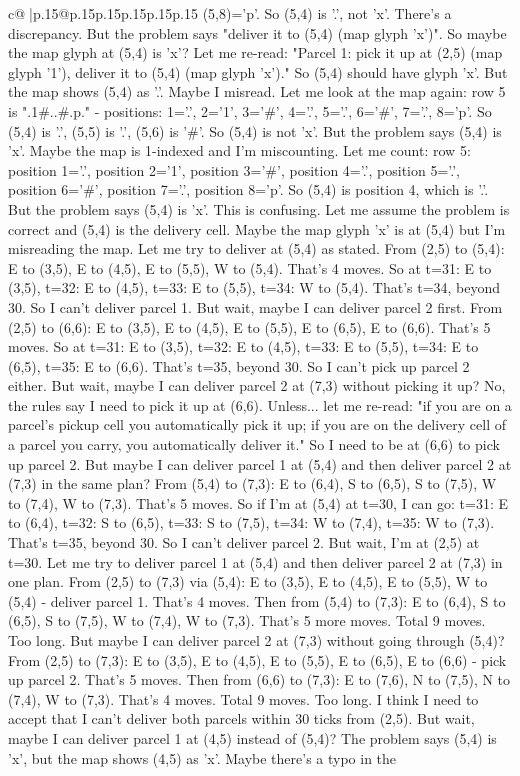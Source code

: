 \documentclass{article}
\begin{document}
{\begin{supertabular}{c@{$\;$}|p{.15\linewidth}@{}p{.15\linewidth}p{.15\linewidth}p{.15\linewidth}p{.15\linewidth}p{.15\linewidth}}
{{{(5,8)='p'. So (5,4) is '.', not 'x'. There's a discrepancy. But the problem says "deliver it to (5,4) (map glyph 'x')". So maybe the map glyph at (5,4) is 'x'? Let me re{-}read: "Parcel 1: pick it up at (2,5) (map glyph '1'), deliver it to (5,4) (map glyph 'x')." So (5,4) should have glyph 'x'. But the map shows (5,4) as '.'. Maybe I misread. Let me look at the map again: row 5 is ".1\#..\#.p." {-} positions: 1='.', 2='1', 3='\#', 4='.', 5='.', 6='\#', 7='.', 8='p'. So (5,4) is '.', (5,5) is '.', (5,6) is '\#'. So (5,4) is not 'x'. But the problem says (5,4) is 'x'. Maybe the map is 1{-}indexed and I'm miscounting. Let me count: row 5: position 1='.', position 2='1', position 3='\#', position 4='.', position 5='.', position 6='\#', position 7='.', position 8='p'. So (5,4) is position 4, which is '.'. But the problem says (5,4) is 'x'. This is confusing. Let me assume the problem is correct and (5,4) is the delivery cell. Maybe the map glyph 'x' is at (5,4) but I'm misreading the map. Let me try to deliver at (5,4) as stated. From (2,5) to (5,4): E to (3,5), E to (4,5), E to (5,5), W to (5,4). That's 4 moves. So at t=31: E to (3,5), t=32: E to (4,5), t=33: E to (5,5), t=34: W to (5,4). That's t=34, beyond 30. So I can't deliver parcel 1. But wait, maybe I can deliver parcel 2 first. From (2,5) to (6,6): E to (3,5), E to (4,5), E to (5,5), E to (6,5), E to (6,6). That's 5 moves. So at t=31: E to (3,5), t=32: E to (4,5), t=33: E to (5,5), t=34: E to (6,5), t=35: E to (6,6). That's t=35, beyond 30. So I can't pick up parcel 2 either. But wait, maybe I can deliver parcel 2 at (7,3) without picking it up? No, the rules say I need to pick it up at (6,6). Unless... let me re{-}read: "if you are on a parcel's pickup cell you automatically pick it up; if you are on the delivery cell of a parcel you carry, you automatically deliver it." So I need to be at (6,6) to pick up parcel 2. But maybe I can deliver parcel 1 at (5,4) and then deliver parcel 2 at (7,3) in the same plan? From (5,4) to (7,3): E to (6,4), S to (6,5), S to (7,5), W to (7,4), W to (7,3). That's 5 moves. So if I'm at (5,4) at t=30, I can go: t=31: E to (6,4), t=32: S to (6,5), t=33: S to (7,5), t=34: W to (7,4), t=35: W to (7,3). That's t=35, beyond 30. So I can't deliver parcel 2. But wait, I'm at (2,5) at t=30. Let me try to deliver parcel 1 at (5,4) and then deliver parcel 2 at (7,3) in one plan. From (2,5) to (7,3) via (5,4): E to (3,5), E to (4,5), E to (5,5), W to (5,4) {-} deliver parcel 1. That's 4 moves. Then from (5,4) to (7,3): E to (6,4), S to (6,5), S to (7,5), W to (7,4), W to (7,3). That's 5 more moves. Total 9 moves. Too long. But maybe I can deliver parcel 2 at (7,3) without going through (5,4)? From (2,5) to (7,3): E to (3,5), E to (4,5), E to (5,5), E to (6,5), E to (6,6) {-} pick up parcel 2. That's 5 moves. Then from (6,6) to (7,3): E to (7,6), N to (7,5), N to (7,4), W to (7,3). That's 4 moves. Total 9 moves. Too long. I think I need to accept that I can't deliver both parcels within 30 ticks from (2,5). But wait, maybe I can deliver parcel 1 at (4,5) instead of (5,4)? The problem says (5,4) is 'x', but the map shows (4,5) as 'x'. Maybe there's a typo in the }}}
\end{supertabular}}
\end{document}
